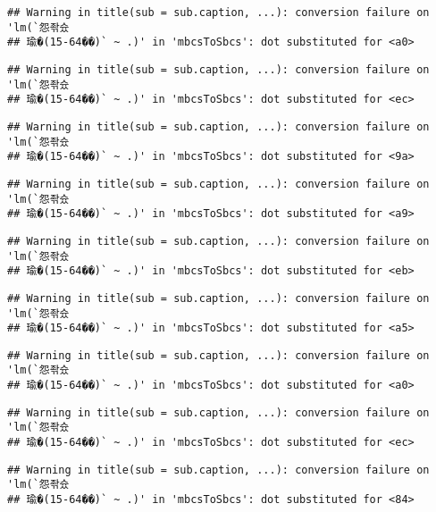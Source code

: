 \documentclass[]{article}
\begin{document}
\begin{verbatim}
## Warning in title(sub = sub.caption, ...): conversion failure on 'lm(`怨좎슜
## 瑜�(15-64��)` ~ .)' in 'mbcsToSbcs': dot substituted for <a0>
\end{verbatim}

\begin{verbatim}
## Warning in title(sub = sub.caption, ...): conversion failure on 'lm(`怨좎슜
## 瑜�(15-64��)` ~ .)' in 'mbcsToSbcs': dot substituted for <ec>
\end{verbatim}

\begin{verbatim}
## Warning in title(sub = sub.caption, ...): conversion failure on 'lm(`怨좎슜
## 瑜�(15-64��)` ~ .)' in 'mbcsToSbcs': dot substituted for <9a>
\end{verbatim}

\begin{verbatim}
## Warning in title(sub = sub.caption, ...): conversion failure on 'lm(`怨좎슜
## 瑜�(15-64��)` ~ .)' in 'mbcsToSbcs': dot substituted for <a9>
\end{verbatim}

\begin{verbatim}
## Warning in title(sub = sub.caption, ...): conversion failure on 'lm(`怨좎슜
## 瑜�(15-64��)` ~ .)' in 'mbcsToSbcs': dot substituted for <eb>
\end{verbatim}

\begin{verbatim}
## Warning in title(sub = sub.caption, ...): conversion failure on 'lm(`怨좎슜
## 瑜�(15-64��)` ~ .)' in 'mbcsToSbcs': dot substituted for <a5>
\end{verbatim}

\begin{verbatim}
## Warning in title(sub = sub.caption, ...): conversion failure on 'lm(`怨좎슜
## 瑜�(15-64��)` ~ .)' in 'mbcsToSbcs': dot substituted for <a0>
\end{verbatim}

\begin{verbatim}
## Warning in title(sub = sub.caption, ...): conversion failure on 'lm(`怨좎슜
## 瑜�(15-64��)` ~ .)' in 'mbcsToSbcs': dot substituted for <ec>
\end{verbatim}

\begin{verbatim}
## Warning in title(sub = sub.caption, ...): conversion failure on 'lm(`怨좎슜
## 瑜�(15-64��)` ~ .)' in 'mbcsToSbcs': dot substituted for <84>
\end{verbatim}
\end{document}
